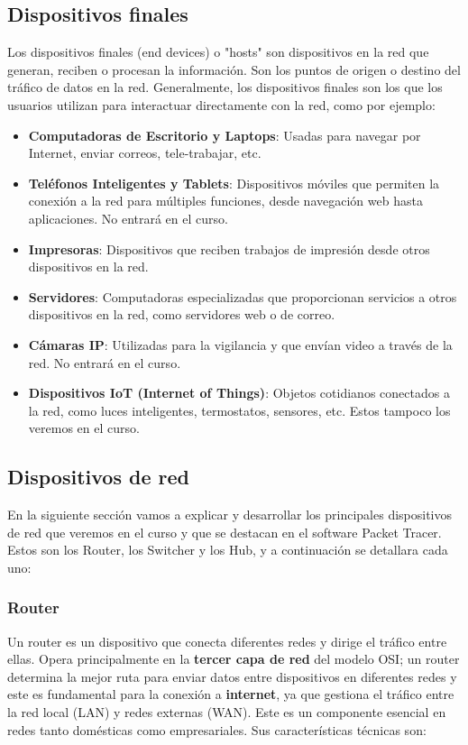 \documentclass{article}
\begin{document}

\subsection{Dispositivos finales}
Los dispositivos finales (end devices) o "hosts" son dispositivos en la red que generan, reciben o procesan la información. Son los puntos de origen o destino del tráfico de datos en la red. Generalmente, los dispositivos finales son los que los usuarios utilizan para interactuar directamente con la red, como por ejemplo: 

\begin{itemize}
    \item \textbf{Computadoras de Escritorio y Laptops}: Usadas para navegar por Internet, enviar correos, tele-trabajar, etc.
    \item \textbf{Teléfonos Inteligentes y Tablets}: Dispositivos móviles que permiten la conexión a la red para múltiples funciones, desde navegación web hasta aplicaciones. No entrará en el curso.
    \item \textbf{Impresoras}: Dispositivos que reciben trabajos de impresión desde otros dispositivos en la red.
    \item \textbf{Servidores}: Computadoras especializadas que proporcionan servicios a otros dispositivos en la red, como servidores web o de correo.
    \item \textbf{Cámaras IP}: Utilizadas para la vigilancia y que envían video a través de la red. No entrará en el curso.
    \item \textbf{Dispositivos IoT (Internet of Things)}: Objetos cotidianos conectados a la red, como luces inteligentes, termostatos, sensores, etc. Estos tampoco los veremos en el curso.
\end{itemize}
    

\subsection{Dispositivos de red}
En la siguiente sección vamos a explicar y desarrollar los principales dispositivos de red que veremos en el curso y que se destacan en el software Packet Tracer. Estos son los Router, los Switcher y los Hub, y a continuación se detallara cada uno:

\subsubsection{Router}
Un router es un dispositivo que conecta diferentes redes y dirige el tráfico entre ellas. Opera principalmente en la \textbf{tercer capa de red} del modelo OSI; un router determina la mejor ruta para enviar datos entre dispositivos en diferentes redes y este es fundamental para la conexión a \textbf{internet}, ya que gestiona el tráfico entre la red local (LAN) y redes externas (WAN). Este es un componente esencial en redes tanto domésticas como empresariales. Sus características técnicas son:
\end{document}

